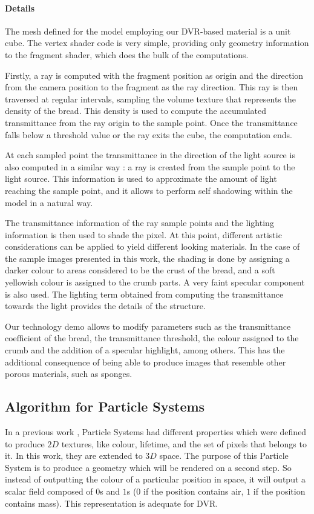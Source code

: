 \documentclass[oneside,a4paper,english,links]{amca}
\begin{document}
\paragraph{Details}

The mesh defined for the model employing our DVR-based material is a unit
cube. The vertex shader code is very simple, providing only geometry
information to the fragment shader, which does the bulk of the
computations. 

Firstly, a ray is computed with the fragment position as origin and
the direction from the camera position to the fragment as the ray
direction. This ray is then traversed at regular intervals, sampling
the volume texture that represents the density of the bread. This
density is used to compute the accumulated transmittance from the ray
origin to the sample point. Once the transmittance falls below a
threshold value or the ray exits the cube, the computation ends.

At each sampled point the transmittance in the direction of the light
source is also computed in a similar way : a ray is created from the
sample point to the light source. This information is used to
approximate the amount of light reaching the sample point, and it
allows to perform self shadowing within the model in a natural
way. 

The transmittance information of the ray sample points and the
lighting information is then used to shade the pixel. At this point,
different artistic considerations can be applied to yield different
looking materials. In the case of the sample images presented
in this work, the shading is done by assigning a darker colour to areas
considered to be the crust of the bread, and a soft yellowish colour is
assigned to the crumb parts. A very faint specular component is also
used. The lighting term obtained from computing the transmittance
towards the light provides the details of the structure.

Our technology demo allows to modify parameters such as the
transmittance coefficient of the bread, the transmittance
threshold, the colour assigned to the crumb and the addition of a
specular highlight, among others. This has the additional consequence
of being able to produce images that resemble other porous materials,
such as sponges.

\subsection{Algorithm for Particle Systems}
In a previous work \citep{Baravalle2011}, Particle Systems had different properties which were defined to produce $2D$ textures, like colour, lifetime, and the set of pixels that belongs to it. In this work, they are extended to $3D$ space. The purpose of this Particle System is to produce a geometry which will be rendered on a second step. So instead of outputting the colour of a particular position in space, it will output a scalar field composed of $0$s and $1$s ($0$ if the position contains air, $1$ if the position contains mass). This representation is adequate for DVR. 
\end{document}
